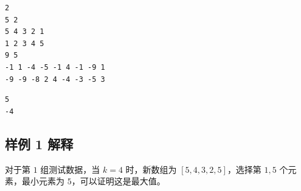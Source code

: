 \begin{minipage}{\linewidth}
	\begin{minipage}[t]{0.49\linewidth}
		\begin{lstlisting}[title=\texttt{standard input}]	
2
5 2
5 4 3 2 1
1 2 3 4 5
9 5
-1 1 -4 -5 -1 4 -1 -9 1
-9 -9 -8 2 4 -4 -3 -5 3
\end{lstlisting}
	\end{minipage}
	\begin{minipage}[t]{0.49\linewidth}
		\begin{lstlisting}[title=\texttt{standard output}]
5
-4
\end{lstlisting}
	\end{minipage}
\end{minipage}

\subsection{样例 1 解释}

对于第 $1$ 组测试数据，当 $k = 4$ 时，新数组为 $[5, 4, 3, 2, 5]$，选择第 $1,5$ 个元素，最小元素为 $5$，可以证明这是最大值。
